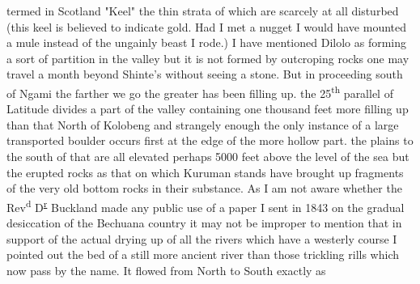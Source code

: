 \documentclass[11pt,twoside]{article}\makeatletter
\begin{document}
termed in Scotland "Keel" the thin strata  \newline of which are scarcely at all disturbed (this  \newline keel is believed to indicate gold. Had I met  \newline a nugget I would have mounted a  \newline mule instead of the ungainly beast I rode.) \newline  \indent I have mentioned Dilolo as forming  \newline a sort of partition in the valley but it is  \newline not formed by outcroping rocks one  \newline may travel a month beyond Shinte's without  \newline seeing a stone. But in proceeding south  \newline of Ngami the farther we go the greater  \newline has been filling up. the 25\textsuperscript{th} parallel  \newline of Latitude divides a part of the valley  \newline containing one thousand feet more filling up  \newline than that North of Kolobeng and strangely  \newline enough the only instance of a large {\newline \newline \noindent [0012]}  \newline transported boulder occurs first at the  \newline edge of the more hollow part. the plains to the  \newline south of that are all elevated perhaps 5000 feet  \newline above the level of the sea but the erupted  \newline rocks as that on which Kuruman stands  \newline have brought up fragments of the very old  \newline bottom rocks in their substance. \newline  \indent As I am not aware whether the Rev\textsuperscript{d}  \newline D\textsuperscript{\uline{r}} Buckland made any public use  \newline of a paper I sent in 1843 on the gradual  \newline desiccation of the Bechuana country it  \newline may not be improper to mention that  \newline in support of the actual drying up of  \newline all the rivers which have a westerly  \newline course I pointed out the bed of a  \newline still more ancient river than those  \newline trickling rills which now pass by the  \newline name. It flowed from North to South  \newline exactly as 
\end{document}
